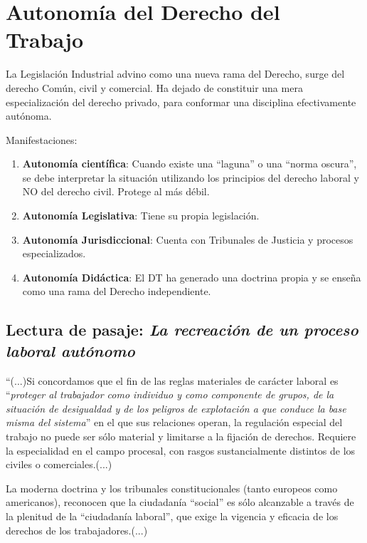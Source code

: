 \documentclass[spanish,12pt,a4paper,titlepage]{report}
\begin{document}
\section{Autonomía del Derecho del Trabajo}
\label{sec:autonomia-del-derecho-del-trabajo}

La Legislación Industrial advino como una nueva rama del Derecho, surge del derecho Común, civil y comercial. Ha dejado de constituir una mera especialización del derecho privado, para conformar una disciplina efectivamente autónoma.

Manifestaciones:
\begin{enumerate}
\item \textbf{Autonomía científica}: Cuando existe una “laguna” o una “norma oscura”, se debe interpretar la situación utilizando los principios del derecho laboral y NO del derecho civil. Protege al más débil.
\item \textbf{Autonomía Legislativa}: Tiene su propia legislación.
\item \textbf{Autonomía Jurisdiccional}: Cuenta con Tribunales de Justicia y procesos especializados.
\item \textbf{Autonomía Didáctica}: El DT ha generado una doctrina propia y se enseña como una rama del Derecho independiente.
\end{enumerate}

\subsection{Lectura de pasaje: \textit{La recreación de un proceso laboral autónomo}}
\label{sec:La-recreacion-de-un-proceso-laboral-autonomo}

``(...)Si concordamos que el fin de las reglas materiales de carácter laboral es ``\textit{proteger al trabajador como individuo y como componente de grupos, de la situación de desigualdad y de los peligros de explotación a que conduce la base misma del sistema}'' en el que sus relaciones operan, la regulación especial del trabajo no puede ser sólo material y limitarse a la fijación de derechos. Requiere la especialidad en el campo procesal, con rasgos sustancialmente distintos de los civiles o comerciales.(...)

La moderna doctrina y los tribunales constitucionales (tanto europeos como americanos), reconocen que la ciudadanía “social” es sólo alcanzable a través de la plenitud de la “ciudadanía laboral”, que exige la vigencia y eficacia de los derechos de los trabajadores.(...)
\end{document}
